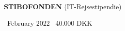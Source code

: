 {\large \color{accent} \textbf{STIBOFONDEN} {\small (IT-Rejsestipendie)}}

\smallskip

\faCalendar\ February 2022 \hspace{50pt} \faMoney\ 40.000 DKK
